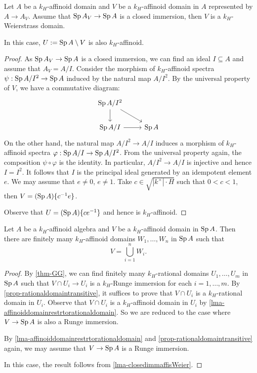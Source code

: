 \begin{lemma}\label{lma-closedimmaffisWeier}
    Let $A$ be a $k_H$-affinoid domain and $V$ be a $k_H$-affinoid domain in $A$ represented by $A\rightarrow A_V$. Assume that $\operatorname{Sp} A_V\rightarrow \operatorname{Sp} A$ is a closed immersion, then $V$ is a $k_H$-Weierstrass domain. 

    In this case, $U:=\operatorname{Sp} A\setminus V$ is also $k_H$-affinoid.
\end{lemma}
\begin{proof}
    As $\operatorname{Sp} A_V\rightarrow \operatorname{Sp} A$ is a closed immersion, we can find an ideal $I\subseteq  A$ and assume that $A_V=A/I$. Consider the morphism of $k_H$-affinoid spectra $\psi:\operatorname{Sp} A/I^2\rightarrow \operatorname{Sp} A$ induced by the natural map $A/I^2$. By the universal property of $V$, we have a commutative diagram:
    \[
        \begin{tikzcd}
            \Sp A/I^2 \arrow[rd] \arrow[d] &       \\
            \Sp A/I \arrow[r]              & \Sp A
        \end{tikzcd}  
    \]
    On the other hand, the natural map $A/I^2\rightarrow A/I$ induces a morphism of $k_H$-affinoid spectra $\varphi:\operatorname{Sp} A/I\rightarrow \operatorname{Sp} A/I^2$. From the universal property again, the composition $\psi\circ \varphi$ is the identity. In particular, $A/I^2\rightarrow A/I$ is injective and hence $I=I^2$. It follows that $I$ is the principal ideal generated by an idempotent element $e$. We may assume that $e\neq 0$, $e\neq 1$. Take $c\in \sqrt{|k^{\times}|\cdot H}$ such that $0<c<1$, then $V=(\operatorname{Sp} A)\{c^{-1}e\}$.

    Observe that $U=(\operatorname{Sp} A)\{ce^{-1}\}$ and hence is $k_H$-affinoid.
\end{proof}


\begin{corollary}\label{cor-GG}
    Let $A$ be a $k_H$-affinoid algebra and $V$ be a $k_H$-affinoid domain in $\operatorname{Sp} A$. Then there are finitely many $k_H$-affinoid domains $W_1,\ldots,W_n$ in $\operatorname{Sp} A$ such that
    \[
        V=\bigcup_{i=1}^n W_i.  
    \]
\end{corollary}
\begin{proof}
    By \cref{thm-GG}, we can find finitely many $k_H$-rational domains $U_1,\ldots,U_m$ in $\operatorname{Sp} A$ such that $V\cap U_i\rightarrow U_i$ is a $k_H$-Runge immersion for each $i=1,\ldots,m$. By \cref{prop-rationaldomaintransitive},
    it suffices to prove that $V\cap U_i$ is a $k_H$-rational domain in $U_i$. Observe that $V\cap U_i$ is a $k_H$-affinoid domain in $U_i$ by \cref{lma-affinoiddomainrestrtorationaldomain}. So we are reduced to the case where $V\rightarrow \operatorname{Sp} A$ is also a Runge immersion.

    By \cref{lma-affinoiddomainrestrtorationaldomain} and \cref{prop-rationaldomaintransitive} again, we may assume that $V\rightarrow \operatorname{Sp} A$ is a Runge immersion. 
    
    In this case, the result follows from \cref{lma-closedimmaffisWeier}. 
\end{proof}


